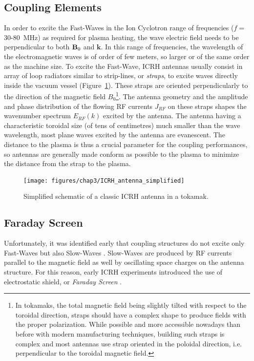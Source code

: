 \subsection{Coupling Elements}
In order to excite the Fast-Waves in the Ion Cyclotron range of frequencies ($f=$30-80~MHz) as required for plasma heating, the wave electric field needs to be perpendicular to both ${\mathbf B}_0$ and $\mathbf{k}$. In this range of frequencies, the wavelength of the electromagnetic waves is of order of few meters, so larger or of the same order as the machine size. To excite the Fast-Wave, ICRH antennas usually consist in array of loop radiators similar to strip-lines, or \textit{straps}, to excite waves directly inside the vacuum vessel (Figure~\ref{fig:icrhantennasimplified}). These straps are oriented perpendicularly to the direction of the magnetic field $B_0$\footnote{In tokamaks, the total magnetic field being slightly tilted with respect to the toroidal direction, straps should have a complex shape to produce fields with the proper polarization. While possible and more accessible nowadays than before with modern manufacturing techniques, building such straps is complex and most antennas use strap oriented in the poloidal direction, i.e. perpendicular to the toroidal magnetic field.}. The antenna geometry and the amplitude and phase distribution of the flowing RF currents $J_{RF}$ on these straps shapes the wavenumber spectrum $E_{RF}(k)$ excited by the antenna. The antenna having a characteristic toroidal size (of tens of centimetres) much smaller than the wave wavelength, most plane waves excited by the antenna are evanescent. The distance to the plasma is thus a crucial parameter for the coupling performances, so antennas are generally made conform as possible to the plasma to minimize the distance from the strap to the plasma. 

\begin{figure}[h]
	\centering
	\texttt{[image: figures/chap3/ICRH\_antenna\_simplified]}
	\caption{Simplified schematic of a classic ICRH antenna in a tokamak.}
	\label{fig:icrhantennasimplified}
\end{figure}



\subsection{Faraday Screen}
Unfortunately, it was identified early that coupling structures do not excite only Fast-Waves but also Slow-Waves . Slow-Waves are produced by RF currents parallel to the magnetic field as well by oscillating space charges on the antenna structure. For this reason, early ICRH experiments introduced the use of electrostatic shield, or \textit{Faraday Screen} . 

